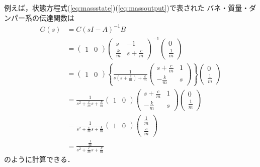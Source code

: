 例えば，状態方程式(\ref{eq:massstate})(\ref{eq:massoutput})で表された
バネ・質量・ダンパー系の伝達関数は
\begin{align}
 G(s)
 &= C (s I - A)^{-1} B \\
 &= \left(
     \begin{array}{cc}
      1 & 0 
     \end{array}
    \right)
    \left(
     \begin{array}{cc}
      s           & -1 \\
      \frac{k}{m} & s+\frac{c}{m}
     \end{array}
    \right)^{-1}
    \left(
     \begin{array}{c}
      0 \\
      \frac{1}{m}
     \end{array}
    \right) \nonumber \\
 &= \left(
     \begin{array}{cc}
      1 & 0 
     \end{array}
    \right)
    \left\{
     \frac{1}{s(s + \frac{c}{m})+\frac{k}{m}}
     \left(
     \begin{array}{cc}
      s+\frac{c}{m} & 1 \\
      -\frac{k}{m}  & s
     \end{array}
     \right)
    \right\}
    \left(
     \begin{array}{c}
      0 \\
      \frac{1}{m}
     \end{array}
    \right) \nonumber \\
 &= \frac{1}{s^2 + \frac{c}{m}s + \frac{k}{m}}
    \left(
     \begin{array}{cc}
      1 & 0 
     \end{array}
    \right)
    \left(
     \begin{array}{cc}
      s+\frac{c}{m} & 1 \\
      -\frac{k}{m}  & s
     \end{array}
    \right)
    \left(
     \begin{array}{c}
      0 \\
      \frac{1}{m}
     \end{array}
    \right) \nonumber \\
 &= \frac{1}{s^2 + \frac{c}{m}s + \frac{k}{m}}
    \left(
     \begin{array}{cc}
      1 & 0 
     \end{array}
    \right)
    \left(
     \begin{array}{c}
      \frac{1}{m} \\
      \frac{s}{m}
     \end{array}
    \right) \nonumber \\
 &= \frac{\frac{1}{m}}{s^2 + \frac{c}{m}s + \frac{k}{m}}
\end{align}
のように計算できる．


